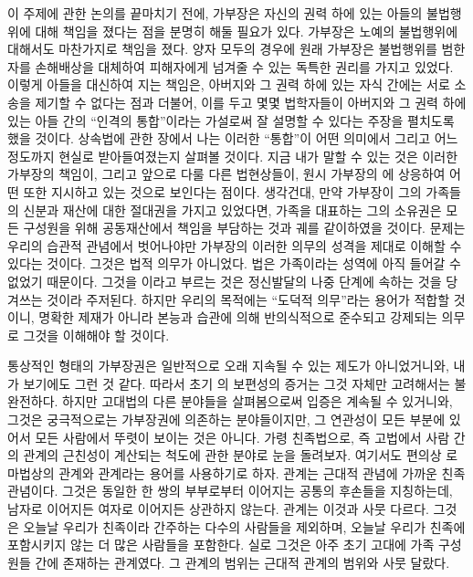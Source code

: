 이 주제에 관한 논의를 끝마치기 전에,
가부장은 자신의 권력 하에 있는 아들의 불법행위에 대해
책임을 졌다는 점을 분명히 해둘 필요가 있다.
가부장은 노예의 불법행위에 대해서도 마찬가지로 책임을 졌다.
양자 모두의 경우에
원래
가부장은
불법행위를 범한 자를
손해배상을 대체하여
피해자에게 넘겨줄 수 있는 독특한 권리를 가지고 있었다.
이렇게 아들을 대신하여 지는 책임은,
아버지와 그 권력 하에 있는 자식 간에는
서로 소송을 제기할 수 없다는 점과 더불어,
이를 두고 몇몇 법학자들이
아버지와 그 권력 하에 있는 아들 간의
``인격의 통합''이라는 가설로써 잘 설명할 수 있다는
주장을 펼치도록 했을 것이다.
상속법에 관한 장에서 나는 이러한 ``통합''이 어떤 의미에서
그리고 어느 정도까지 현실로 받아들여졌는지 살펴볼 것이다.
지금 내가 말할 수 있는 것은
이러한 가부장의 책임이, 그리고 앞으로 다룰 다른 법현상들이,
원시 가부장의 에 상응하여 어떤  또한
지시하고 있는 것으로 보인다는 점이다.
생각건대,
만약 가부장이 그의 가족들의 신분과 재산에 대한 절대권을 가지고 있었다면,
가족을 대표하는 그의 소유권은 모든 구성원을 위해 공동재산에서 책임을
부담하는 것과 궤를 같이하였을 것이다.
문제는 우리의 습관적 관념에서 벗어나야만 가부장의 이러한 의무의 성격을
제대로 이해할 수 있다는 것이다.
그것은 법적 의무가 아니었다. 법은 가족이라는 성역에 아직
들어갈 수 없었기 때문이다.
그것을 이라고 부르는 것은 정신발달의 나중 단계에 속하는 것을
당겨쓰는 것이라 주저된다.
하지만 우리의 목적에는 ``도덕적 의무''라는 용어가 적합할 것이니,
명확한 제재가 아니라 본능과 습관에 의해 반의식적으로
준수되고 강제되는 의무로 그것을 이해해야 할 것이다.

통상적인 형태의 가부장권은 일반적으로 오래 지속될 수 있는 제도가 아니었거니와,
내가 보기에도 그런 것 같다.
따라서 초기 의 보편성의 증거는 그것 자체만 고려해서는 불완전하다.
하지만 고대법의 다른 분야들을 살펴봄으로써 입증은 계속될 수 있거니와,
그것은 궁극적으로는 가부장권에 의존하는 분야들이지만,
그 연관성이 모든 부분에 있어서 모든 사람에서 뚜렷이 보이는 것은 아니다.
가령 친족법으로,
즉 고법에서 사람 간의 관계의 근친성이 계산되는 척도에 관한 분야로
눈을 돌려보자.
여기서도 편의상 로마법상의 관계와
관계라는 용어를 사용하기로 하자.
관계는 근대적 관념에 가까운 친족 관념이다.
그것은 동일한 한 쌍의 부부로부터 이어지는 공통의 후손들을 지칭하는데,
남자로 이어지든 여자로 이어지든 상관하지 않는다.
관계는 이것과 사뭇 다르다.
그것은 오늘날 우리가 친족이라 간주하는 다수의 사람들을 제외하며,
오늘날 우리가 친족에 포함시키지 않는 더 많은 사람들을 포함한다.
실로 그것은 아주 초기 고대에 가족 구성원들 간에 존재하는 관계였다.
그 관계의 범위는 근대적 관계의 범위와 사뭇 달랐다.

